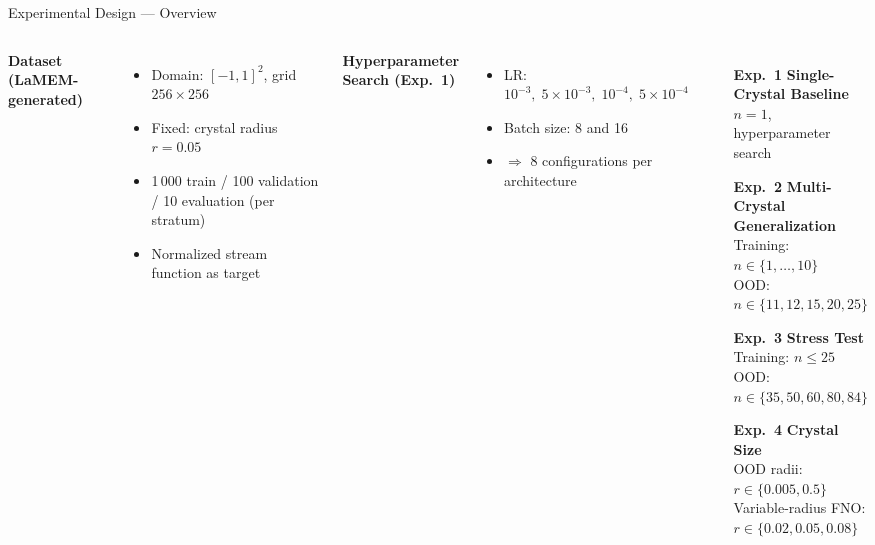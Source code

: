 \documentclass[aspectratio=169, 10pt]{beamer}
\begin{document}
\begin{frame}{Experimental Design — Overview}
  \begin{columns}[T]
      \textbf{Dataset (LaMEM-generated)}
      \begin{itemize}
        \item Domain: $[-1,1]^2$, grid $256\times256$
        \item Fixed: crystal radius $r = 0.05$
        \item 1\,000 train / 100 validation / 10 evaluation (per stratum)
        \item Normalized stream function as target
      \end{itemize}

      \vspace{0.8em}
      \textbf{Hyperparameter Search (Exp.~1)}
      \begin{itemize}
        \item LR: $10^{-3},\; 5\!\times\!10^{-3},\; 10^{-4},\; 5\!\times\!10^{-4}$
        \item Batch size: 8 and 16
        \item $\Rightarrow$ 8 configurations per architecture
      \end{itemize}

      \begin{enumerate}
        \item[\textbf{Exp.~1}] \textbf{Single-Crystal Baseline}\\
          $n = 1$, hyperparameter search
        \vspace{0.4em}
        \item[\textbf{Exp.~2}] \textbf{Multi-Crystal Generalization}\\
          Training: $n \in \{1,\ldots,10\}$\\
          OOD: $n \in \{11, 12, 15, 20, 25\}$
        \vspace{0.4em}
        \item[\textbf{Exp.~3}] \textbf{Stress Test}\\
          Training: $n \leq 25$\\
          OOD: $n \in \{35, 50, 60, 80, 84\}$
        \vspace{0.4em}
        \item[\textbf{Exp.~4}] \textbf{Crystal Size}\\
          OOD radii: $r \in \{0.005, 0.5\}$\\
          Variable-radius FNO: $r \in \{0.02, 0.05, 0.08\}$
      \end{enumerate}
  \end{columns}
\end{frame}
\end{document}
